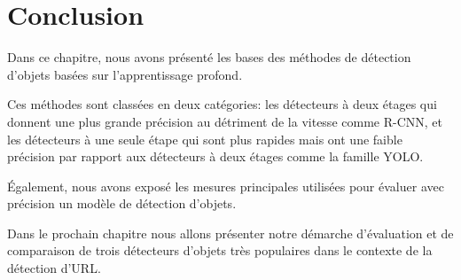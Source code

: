      


\section{Conclusion} 
Dans ce chapitre, nous avons présenté les bases des méthodes de détection d'objets basées sur l'apprentissage profond.

Ces méthodes sont classées en deux catégories:  les détecteurs à deux étages qui donnent une plus grande précision au détriment de la vitesse comme R-CNN, et les détecteurs à une seule étape qui sont plus rapides mais ont une faible précision par rapport aux détecteurs à deux étages comme la famille YOLO.

Également, nous avons exposé les mesures principales utilisées pour évaluer avec précision un modèle de détection d'objets.

Dans le prochain chapitre nous allons présenter notre démarche d'évaluation et  de comparaison de trois détecteurs d'objets très populaires dans le contexte de la détection d'URL.
